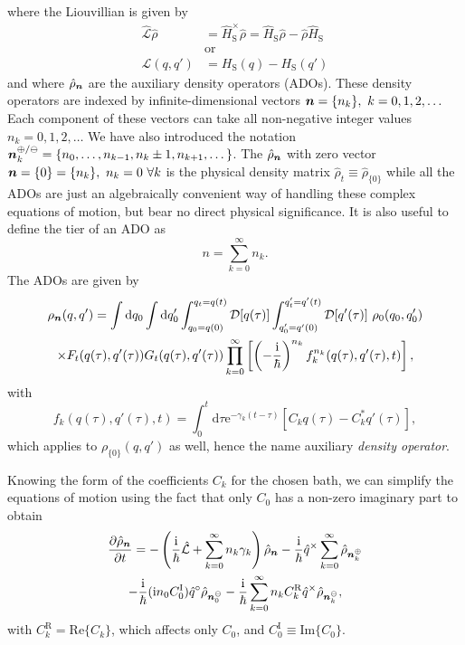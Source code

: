where the Liouvillian is given by
\begin{equation}
	\begin{split}
	\hat{\mathcal{L}}\hat{\rho} &= \hat{H}_\mathrm{S}^\times \hat{\rho} = \hat{H}_\mathrm{S}\hat{\rho}-\hat{\rho}\hat{H}_\mathrm{S}\\
	&\text{or}\\
	\mathcal{L}(q,q') &=  H_\mathrm{S}(q)-H_\mathrm{S}(q')
	\end{split}
\end{equation}
and where $\hat{\rho}_{\bm{n}}$ are the auxiliary density operators (ADOs). These density operators are indexed by infinite-dimensional vectors $\bm{n} = \{n_k\},\ k=0,1,2,\dots$ Each component of these vectors can take all non-negative integer values $n_k = 0,1,2,\dots$ We have also introduced the notation $\bm{n}_k^{\oplus/\ominus} = \{n_0,\dots,n_{k-1},n_k\pm1,n_{k+1},\dots\}$. The $\hat{\rho}_{\bm{n}}$ with zero vector $\bm{n} = \{0\} = \{n_k\},\ n_k=0\ \forall k$ is the physical density matrix $\hat{\rho}_t \equiv \hat{\rho}_{\{0\}}$ while all the ADOs are just an algebraically convenient way of handling these complex equations of motion, but bear no direct physical significance. It is also useful to define the tier of an ADO as
\begin{equation}
	n = \sum_{k=0}^{\infty} n_k.
	\label{eq:tier}
\end{equation}
\newpage
\noindent The ADOs are given by
\begin{multline}
	\rho_{\bm{n}}(q,q') = 
\int\mathrm{d}q_0 
\int\mathrm{d}q_0'
\int_{q_0= q(0)}^{q_t = q(t)} \mathcal{D}[q(\tau)]
\int_{q_0'= q'(0)}^{q_t'= q'(t)} \mathcal{D}[q'(\tau)]
\ \rho_0(q_0,q_0')
\\
\times F_t(q(\tau),q'(\tau))G_t(q(\tau),q'(\tau))
\prod_{k=0}^{\infty}
\left[
\left(-\frac{\mathrm{i}}{\hbar}\right)^{n_k}f_k^{n_k}(q(\tau),q'(\tau),t)
\right],
\end{multline}
with
\begin{equation}
	f_k(q(\tau),q'(\tau),t) = \int_0^{t}\mathrm{d}\tau \mathrm{e}^{-\gamma_k (t-\tau)}
	[C_k q(\tau)-C_k^*q'(\tau)],
\end{equation}
which applies to $\rho_{\{0\}}(q,q')$ as well, hence the name auxiliary \emph{density operator}.

Knowing the form of the coefficients $C_k$ for the chosen bath, we can simplify the equations of motion using the fact that only $C_0$ has a non-zero imaginary part to obtain
\begin{multline}
\frac{\partial \hat{\rho}_{\bm{n}} }{\partial t} =
-\left(\frac{\mathrm{i}}{\hbar}\hat{\mathcal{L}}+\sum_{k=0}^{\infty}n_k \gamma_k \right)\hat{\rho}_{\bm{n}}
-\frac{\mathrm{i}}{\hbar}\hat{q}^\times \sum_{k=0}^{\infty}\hat{\rho}_{\bm{n}_k^\oplus} \\
-\frac{\mathrm{i}}{\hbar}(\mathrm{i} n_0 C_0^\mathrm{I})\hat{q}^\circ\hat{\rho}_{\bm{n}_0^\ominus}
-\frac{\mathrm{i}}{\hbar}\sum_{k=0}^{\infty}n_k C_k^\mathrm{R}\hat{q}^\times\hat{\rho}_{\bm{n}_k^\ominus},
\label{eq:eom_real}
\end{multline}
with $C_k^\mathrm{R} = \mathrm{Re}\{C_k\}$, which affects only $C_0$, and $C_0^\mathrm{I}\equiv \mathrm{Im}\{C_0\}$.

